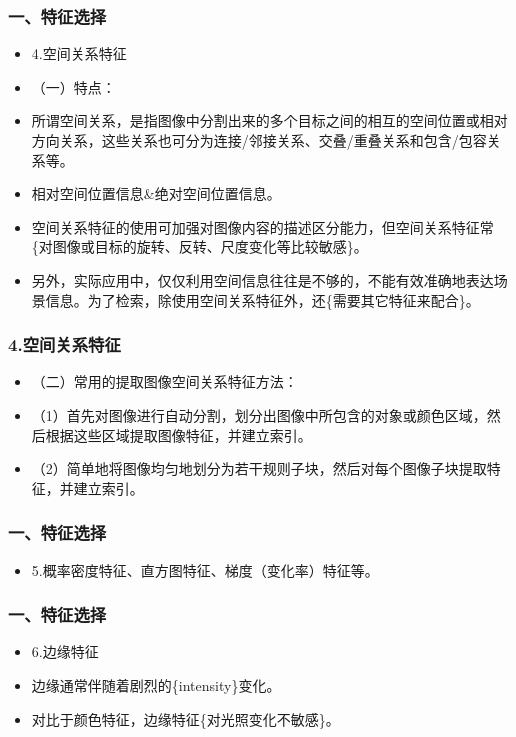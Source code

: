 \documentclass[notheorems,mathserif,table,compress]{beamer}  %
\begin{document}
\begin{frame}
  \frametitle{一、特征选择}
  \begin{itemize}
  \item 4.空间关系特征
  \item （一）特点：
  \item 所谓空间关系，是指图像中分割出来的多个目标之间的相互的空间位置或相对方向关系，这些关系也可分为连接/邻接关系、交叠/重叠关系和包含/包容关系等。
  \item 相对空间位置信息\&绝对空间位置信息。
  \item 空间关系特征的使用可加强对图像内容的描述区分能力，但空间关系特征常\{对图像或目标的旋转、反转、尺度变化等比较敏感\}。
  \item 另外，实际应用中，仅仅利用空间信息往往是不够的，不能有效准确地表达场景信息。为了检索，除使用空间关系特征外，还\{需要其它特征来配合\}。
  \end{itemize}
\end{frame}

\begin{frame}
  \frametitle{4.空间关系特征}
  \begin{itemize}
  \item （二）常用的提取图像空间关系特征方法：
  \item （1）首先对图像进行自动分割，划分出图像中所包含的对象或颜色区域，然后根据这些区域提取图像特征，并建立索引。
  \item （2）简单地将图像均匀地划分为若干规则子块，然后对每个图像子块提取特征，并建立索引。
  \end{itemize}
\end{frame}

\begin{frame}
  \frametitle{一、特征选择}
  \begin{itemize}
  \item 5.概率密度特征、直方图特征、梯度（变化率）特征等。
  \end{itemize}
\end{frame}

\begin{frame}
  \frametitle{一、特征选择}
  \begin{itemize}
  \item 6.边缘特征
  \item 边缘通常伴随着剧烈的\{intensity\}变化。
  \item 对比于颜色特征，边缘特征\{对光照变化不敏感\}。
  \end{itemize}
\end{frame}
\end{document}

